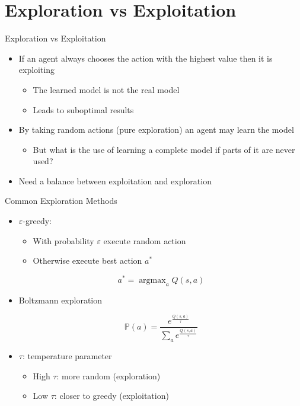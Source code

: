 \documentclass[11pt,table]{beamer}
\begin{document}
\section{Exploration vs Exploitation}
\begin{frame}{Exploration vs Exploitation}


    \begin{itemize}
        \item If an agent always chooses the action with the highest value then it is \textcolor{red1}{exploiting}
\begin{itemize}
    \item The learned model is not the real model
\item Leads to suboptimal results\\[2ex]
 
\end{itemize}
\item By taking random actions (pure \textcolor{red1}{exploration}) an  agent may learn the model
\begin{itemize}
    \item But what is the use of learning a complete model if  parts of it are never used?\\[2ex]
 
\end{itemize}
\item Need a balance between exploitation and  exploration
 
    \end{itemize}
\end{frame}

\begin{frame}{Common Exploration Methods}


    \begin{itemize}
        \item $\varepsilon$-greedy:

\begin{itemize}
    
\item  With probability $\varepsilon$ execute random action

\item  Otherwise execute best action $a^{*}$
\end{itemize}
$$a^{*}=\operatorname{argmax}_{a} Q(s, a)$$ 

\item Boltzmann exploration

$$
\mathbb{P}(a)=\displaystyle\frac{e^{\displaystyle\frac{Q(s, a)}{\tau}}}{\sum_{a} e^{\displaystyle\frac{Q(s, a)}{\tau}}}
$$
	        \item \( \tau \): temperature parameter
            \begin{itemize}
                \item High \( \tau \): more random (exploration)
                \item Low \( \tau \): closer to greedy (exploitation)
            \end{itemize} 
    \end{itemize}
	
\end{frame}
\end{document}
